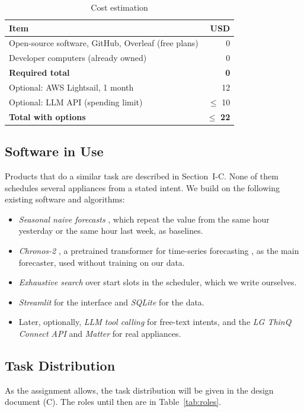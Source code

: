 \documentclass[conference,a4paper]{IEEEtran}
\begin{document}
\begin{table}[t]
\caption{Cost estimation}
\label{tab:cost}
\centering
\footnotesize
\begin{tabular}{@{}lr@{}}
\toprule
\textbf{Item} & \textbf{USD}\\
\midrule
Open-source software, GitHub, Overleaf (free plans) & 0\\
Developer computers (already owned) & 0\\
\textbf{Required total} & \textbf{0}\\
\midrule
Optional: AWS Lightsail, 1 month & 12\\
Optional: LLM API (spending limit) & $\le$ 10\\
\textbf{Total with options} & $\le$ \textbf{22}\\
\bottomrule
\end{tabular}
\end{table}

\subsection{Software in Use}
Products that do a similar task are described in Section~I-C. None of them schedules several appliances from a stated intent. We build on the following existing software and algorithms:
\begin{itemize}
\item \emph{Seasonal naive forecasts} \cite{hyndman}, which repeat the value from the same hour yesterday or the same hour last week, as baselines.
\item \emph{Chronos-2} \cite{chronos2}, a pretrained transformer for time-series forecasting \cite{chronos}, as the main forecaster, used without training on our data.
\item \emph{Exhaustive search} over start slots in the scheduler, which we write ourselves.
\item \emph{Streamlit} \cite{streamlit} for the interface and \emph{SQLite} \cite{sqlite} for the data.
\item Later, optionally, \emph{LLM tool calling} \cite{claudedocs} for free-text intents, and the \emph{LG ThinQ Connect API} \cite{thinqconnect} and \emph{Matter} \cite{matter} for real appliances.
\end{itemize}

\subsection{Task Distribution}
As the assignment allows, the task distribution will be given in the design document (C). The roles until then are in Table~\ref{tab:roles}.
\end{document}
